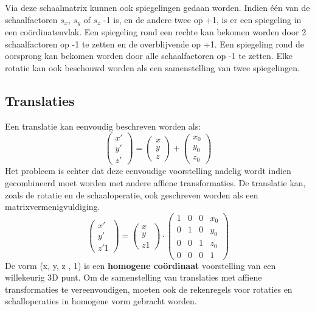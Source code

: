 \documentclass{report}
\begin{document}
	Via deze schaalmatrix kunnen ook spiegelingen gedaan worden. Indien één van de schaalfactoren $s_x$, $s_y$ of $s_z$ -1 is, en de andere twee op +1, is er een spiegeling in een coördinatenvlak. Een spiegeling rond een rechte kan bekomen worden door 2 schaalfactoren op -1 te zetten en de overblijvende op +1. Een spiegeling rond de oorsprong kan bekomen worden door alle schaalfactoren op -1 te zetten.
	Elke rotatie kan ook beschouwd worden als een samenstelling van twee spiegelingen.

	\subsection{Translaties}
	Een translatie kan eenvoudig beschreven worden als:
	$$
		\begin{pmatrix}
			x' \\
			y' \\
			z'
		\end{pmatrix}
		=
		\begin{pmatrix}
			x \\
			y \\ 
			z
		\end{pmatrix}
		+
		\begin{pmatrix}
			 x_0 \\
			 y_0 \\
			 z_0
		\end{pmatrix}
	$$
	Het probleem is echter dat deze eenvoudige voorstelling nadelig wordt indien gecombineerd moet worden met andere affiene transformaties. De translatie kan, zoals de rotatie en de schaaloperatie, ook geschreven worden als een matrixvermenigvuldiging.
	$$
\begin{pmatrix}
x' \\
y' \\
z'
1
\end{pmatrix}
=
\begin{pmatrix}
x \\
y \\ 
z
1
\end{pmatrix}
\cdot
\begin{pmatrix}
1 & 0 & 0 & x_0 \\
0 & 1 & 0 & y_0 \\
0 & 0 & 1 & z_0 \\
0 & 0 & 0 & 1
\end{pmatrix}
$$
De vorm (x, y, z , 1) is een \textbf{homogene coördinaat} voorstelling van een willekeurig 3D punt. Om de samenstelling van translaties met affiene transformaties te vereenvoudigen, moeten ook de rekenregels voor rotaties en schalloperaties in homogene vorm gebracht worden. 
\end{document}
